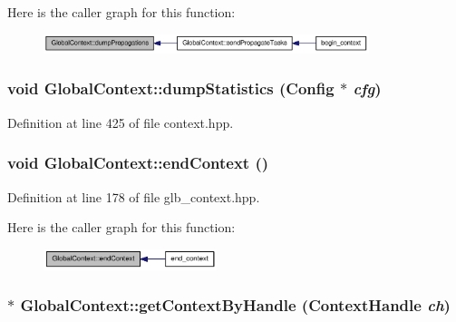 Here is the caller graph for this function:\nopagebreak
\begin{figure}[H]
\begin{center}
\leavevmode
\includegraphics[width=269pt]{class_global_context_a6a4ed0adbb91872d956babaf32e3466c_icgraph}
\end{center}
\end{figure}
\hypertarget{class_global_context_acc1cb373d80601e3a43f28db871aac10}{
\subsubsection[{dumpStatistics}]{\setlength{\rightskip}{0pt plus 5cm}void GlobalContext::dumpStatistics ({\bf Config} $\ast$ {\em cfg})}}
\label{class_global_context_acc1cb373d80601e3a43f28db871aac10}


Definition at line 425 of file context.hpp.\hypertarget{class_global_context_a67e7eba1f3ea2ff2cc9d321a64f8d2b4}{
\subsubsection[{endContext}]{\setlength{\rightskip}{0pt plus 5cm}void GlobalContext::endContext ()}}
\label{class_global_context_a67e7eba1f3ea2ff2cc9d321a64f8d2b4}


Definition at line 178 of file glb\_\-context.hpp.

Here is the caller graph for this function:\nopagebreak
\begin{figure}[H]
\begin{center}
\leavevmode
\includegraphics[width=143pt]{class_global_context_a67e7eba1f3ea2ff2cc9d321a64f8d2b4_icgraph}
\end{center}
\end{figure}
\hypertarget{class_global_context_abed42c65852eb40358a222c34108c65a}{
\subsubsection[{getContextByHandle}]{ $\ast$ GlobalContext::getContextByHandle ({\bf ContextHandle} {\em ch})}}
\label{class_global_context_abed42c65852eb40358a222c34108c65a}


